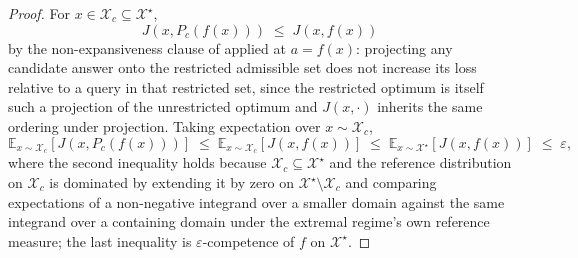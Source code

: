 \documentclass[11pt,twocolumn,a4paper]{article}
\theoremstyle{rdm}
\theoremstyle{definition}
\theoremstyle{remark}
\newcommand{\Cands}{\mathcal{X}}
\newcommand{\eps}{\varepsilon}
\begin{document}
\begin{proof}
For $x \in \Cands_c \subseteq \Cands^\star$,
\[
J(x, P_c(f(x))) \;\le\; J(x, f(x))
\]
by the non-expansiveness clause of  applied at $a = f(x)$:
projecting any candidate answer onto the restricted admissible set does not
increase its loss relative to a query in that restricted set, since the
restricted optimum is itself such a projection of the unrestricted optimum
and $J(x,\cdot)$ inherits the same ordering under projection. Taking
expectation over $x \sim \Cands_c$,
\[
\mathbb{E}_{x\sim\Cands_c}[J(x,P_c(f(x)))]
\;\le\;
\mathbb{E}_{x\sim\Cands_c}[J(x,f(x))]
\;\le\;
\mathbb{E}_{x\sim\Cands^\star}[J(x,f(x))]
\;\le\;\eps,
\]
where the second inequality holds because $\Cands_c \subseteq \Cands^\star$
and the reference distribution on $\Cands_c$ is dominated by extending it by
zero on $\Cands^\star\setminus\Cands_c$ and comparing expectations of a
non-negative integrand over a smaller domain against the same integrand over
a containing domain under the extremal regime's own reference measure; the
last inequality is $\eps$-competence of $f$ on $\Cands^\star$.
\end{proof}
\end{document}
